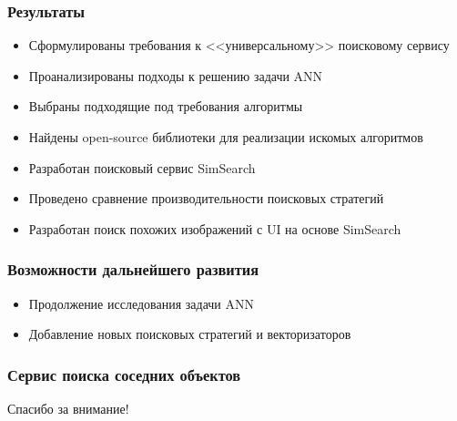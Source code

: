\documentclass{beamer}
\begin{document}
\begin{frame}
\frametitle{Результаты}


\begin{itemize}
\item Сформулированы требования к <<универсальному>> поисковому сервису
\item Проанализированы подходы к решению задачи ANN
\item Выбраны подходящие под требования алгоритмы
\item Найдены open-source библиотеки для реализации искомых алгоритмов
\item Разработан поисковый сервис SimSearch
\item Проведено сравнение производительности поисковых стратегий
\item Разработан поиск похожих изображений с UI на основе SimSearch
\end{itemize}

\end{frame}

\begin{frame}
\frametitle{Возможности дальнейшего развития}

\begin{itemize}
\item Продолжение исследования задачи ANN
\item Добавление новых поисковых стратегий и векторизаторов
\end{itemize}

\end{frame}

\begin{frame}
\frametitle{Сервис поиска соседних объектов}

\begin{center}
Спасибо за внимание!
\end{center}
\end{frame}
\end{document}
